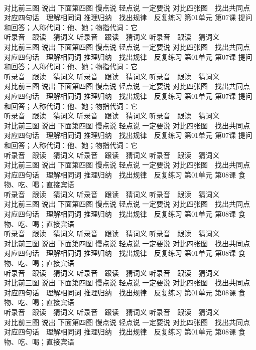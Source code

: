 \documentclass[8pt]{extreport}
\begin{document}
\begin{CJK}{UTF8}{min}
\\	对比前三图 说出 下面第四图 慢点说 轻点说 一定要说	对比四张图　找出共同点 对应四句话　理解相同词 推理归纳　找出规律　反复练习 第01单元 第07课 提问和回答；人称代词：他、她；物指代词：它
\\	听录音　跟读　猜词义 听录音　跟读　猜词义 听录音　跟读　猜词义 
\\	对比前三图 说出 下面第四图 慢点说 轻点说 一定要说	对比四张图　找出共同点 对应四句话　理解相同词 推理归纳　找出规律　反复练习 第01单元 第07课 提问和回答；人称代词：他、她；物指代词：它
\\	听录音　跟读　猜词义 听录音　跟读　猜词义 听录音　跟读　猜词义 
\\	对比前三图 说出 下面第四图 慢点说 轻点说 一定要说	对比四张图　找出共同点 对应四句话　理解相同词 推理归纳　找出规律　反复练习 第01单元 第07课 提问和回答；人称代词：他、她；物指代词：它
\\	听录音　跟读　猜词义 听录音　跟读　猜词义 听录音　跟读　猜词义 
\\	对比前三图 说出 下面第四图 慢点说 轻点说 一定要说	对比四张图　找出共同点 对应四句话　理解相同词 推理归纳　找出规律　反复练习 第01单元 第07课 提问和回答；人称代词：他、她；物指代词：它
\\	听录音　跟读　猜词义 听录音　跟读　猜词义 听录音　跟读　猜词义 
\\	对比前三图 说出 下面第四图 慢点说 轻点说 一定要说	对比四张图　找出共同点 对应四句话　理解相同词 推理归纳　找出规律　反复练习 第01单元 第08课 食物、吃、喝；直接宾语
\\	听录音　跟读　猜词义 听录音　跟读　猜词义 听录音　跟读　猜词义 
\\	对比前三图 说出 下面第四图 慢点说 轻点说 一定要说	对比四张图　找出共同点 对应四句话　理解相同词 推理归纳　找出规律　反复练习 第01单元 第08课 食物、吃、喝；直接宾语
\\	听录音　跟读　猜词义 听录音　跟读　猜词义 听录音　跟读　猜词义 
\\	对比前三图 说出 下面第四图 慢点说 轻点说 一定要说	对比四张图　找出共同点 对应四句话　理解相同词 推理归纳　找出规律　反复练习 第01单元 第08课 食物、吃、喝；直接宾语
\\	听录音　跟读　猜词义 听录音　跟读　猜词义 听录音　跟读　猜词义 
\\	对比前三图 说出 下面第四图 慢点说 轻点说 一定要说	对比四张图　找出共同点 对应四句话　理解相同词 推理归纳　找出规律　反复练习 第01单元 第08课 食物、吃、喝；直接宾语
\\	听录音　跟读　猜词义 听录音　跟读　猜词义 听录音　跟读　猜词义 
\\	对比前三图 说出 下面第四图 慢点说 轻点说 一定要说	对比四张图　找出共同点 对应四句话　理解相同词 推理归纳　找出规律　反复练习 第01单元 第08课 食物、吃、喝；直接宾语

\end{CJK}
\end{document}
